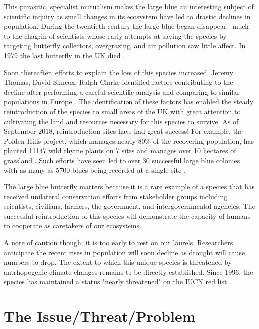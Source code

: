 \documentclass[12pt, twocolumn, letterpaper]{article}
\begin{document}
This parasitic, specialist mutualism makes the large blue an interesting subject of scientific inquiry as small changes in its ecosystem have led to drastic declines in population. During the twentieth century the large blue began disappear-- much to the chagrin of scientists whose early attempts at saving the species by targeting butterfly collectors, overgrazing, and air pollution saw little affect. In 1979 the last butterfly in the UK died \cite{noauthor_how_2009}. 

Soon thereafter, efforts to explain the loss of this species increased. Jeremy Thomas, David Simcox, Ralph Clarke identified factors contributing to the decline after performing a careful scientific analysis and comparing to similar populations in Europe \cite{noauthor_how_2009}. The identification of these factors has enabled the steady reintroduction of the species to small areas of the UK with great attention to cultivating the land and resources necessary for this species to survive. As of September 2018, reintroduction sites have had great success! For example, the Polden Hills project, which manages nearly 80\% of the recovering population, has planted 11147 wild thyme plants on 7 sites and manages over 10 hectares of grassland \cite{noauthor_expanding_nodate}. Such efforts have seen led to over 30 successful large blue colonies with as many as 5700 blues being recorded at a single site \cite{noauthor_expanding_nodate, morris_large_2018}. 

The large blue butterfly matters because it is a rare example of a species that has received unilateral conservation efforts from stakeholder groups including scientists, civilians, farmers, the government, and intergovernmental agencies. The successful reintroduction of this species will demonstrate the capacity of humans to cooperate as caretakers of our ecosystems. 

A note of caution though; it is too early to rest on our laurels. Researchers anticipate the recent rises in population will soon decline as drought will cause numbers to drop. The extent to which this unique species is threatened by antrhopogenic climate changes remains to be directly established. Since 1996, the species has maintained a status "nearly threatened" on the IUCN red list \cite{noauthor_iucn_nodate}.

\section*{The Issue/Threat/Problem}
\end{document}
